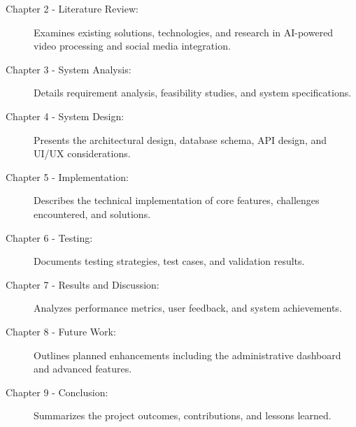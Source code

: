 \begin{description}
    \item[Chapter 2 - Literature Review:] Examines existing solutions, technologies, and research in AI-powered video processing and social media integration.
    
    \item[Chapter 3 - System Analysis:] Details requirement analysis, feasibility studies, and system specifications.
    
    \item[Chapter 4 - System Design:] Presents the architectural design, database schema, API design, and UI/UX considerations.
    
    \item[Chapter 5 - Implementation:] Describes the technical implementation of core features, challenges encountered, and solutions.
    
    \item[Chapter 6 - Testing:] Documents testing strategies, test cases, and validation results.
    
    \item[Chapter 7 - Results and Discussion:] Analyzes performance metrics, user feedback, and system achievements.
    
    \item[Chapter 8 - Future Work:] Outlines planned enhancements including the administrative dashboard and advanced features.
    
    \item[Chapter 9 - Conclusion:] Summarizes the project outcomes, contributions, and lessons learned.
\end{description}
